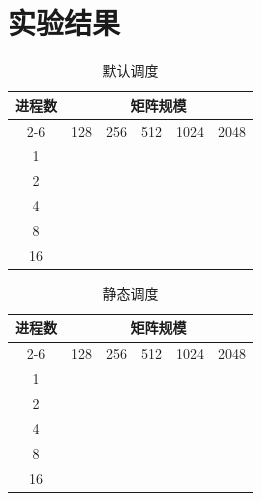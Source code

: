 \documentclass{SYSUReport}
\begin{document}
\section{实验结果}
\begin{table}[H]
\centering
\caption{默认调度}
\label{表1}
\begin{tabular}{|c|lllll|}
\hline
\multirow{2}{*}{进程数} & \multicolumn{5}{c|}{矩阵规模}                                                                        \\ \cline{2-6} 
 & \multicolumn{1}{l|}{128} & \multicolumn{1}{l|}{256} & \multicolumn{1}{l|}{512} & \multicolumn{1}{l|}{1024} & 2048 \\ \hline
1                    & \multicolumn{1}{l|}{} & \multicolumn{1}{l|}{} & \multicolumn{1}{l|}{} & \multicolumn{1}{l|}{} &  \\ \hline
2                    & \multicolumn{1}{l|}{} & \multicolumn{1}{l|}{} & \multicolumn{1}{l|}{} & \multicolumn{1}{l|}{} &  \\ \hline
4                    & \multicolumn{1}{l|}{} & \multicolumn{1}{l|}{} & \multicolumn{1}{l|}{} & \multicolumn{1}{l|}{} &  \\ \hline
8                    & \multicolumn{1}{l|}{} & \multicolumn{1}{l|}{} & \multicolumn{1}{l|}{} & \multicolumn{1}{l|}{} &  \\ \hline
16                   & \multicolumn{1}{l|}{} & \multicolumn{1}{l|}{} & \multicolumn{1}{l|}{} & \multicolumn{1}{l|}{} &  \\ \hline
\end{tabular}
\end{table}

\begin{table}[H]
\centering
\caption{静态调度}
\label{表2}
\begin{tabular}{|c|lllll|}
\hline
\multirow{2}{*}{进程数} & \multicolumn{5}{c|}{矩阵规模}                                                                        \\ \cline{2-6} 
 & \multicolumn{1}{l|}{128} & \multicolumn{1}{l|}{256} & \multicolumn{1}{l|}{512} & \multicolumn{1}{l|}{1024} & 2048 \\ \hline
1                    & \multicolumn{1}{l|}{} & \multicolumn{1}{l|}{} & \multicolumn{1}{l|}{} & \multicolumn{1}{l|}{} &  \\ \hline
2                    & \multicolumn{1}{l|}{} & \multicolumn{1}{l|}{} & \multicolumn{1}{l|}{} & \multicolumn{1}{l|}{} &  \\ \hline
4                    & \multicolumn{1}{l|}{} & \multicolumn{1}{l|}{} & \multicolumn{1}{l|}{} & \multicolumn{1}{l|}{} &  \\ \hline
8                   & \multicolumn{1}{l|}{} & \multicolumn{1}{l|}{} & \multicolumn{1}{l|}{} & \multicolumn{1}{l|}{} &  \\ \hline
16                   & \multicolumn{1}{l|}{} & \multicolumn{1}{l|}{} & \multicolumn{1}{l|}{} & \multicolumn{1}{l|}{} &  \\ \hline
\end{tabular}
\end{table}
\end{document}
